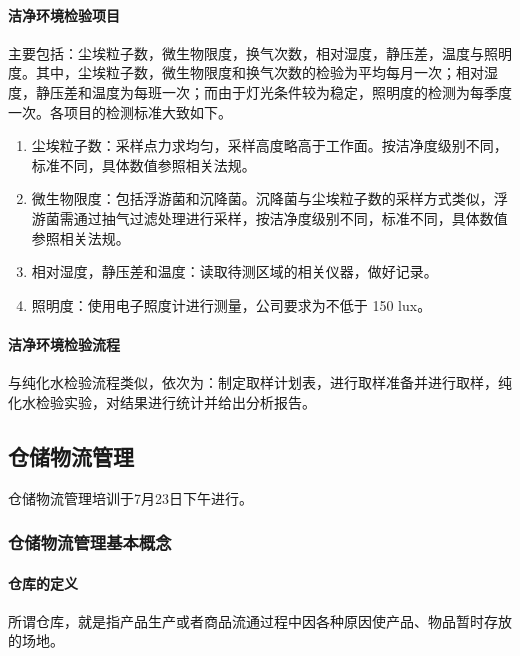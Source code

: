 \documentclass[cn,black,12pt,normal]{elegantnote}
\begin{document}
\paragraph{洁净环境检验项目} 主要包括：尘埃粒子数，微生物限度，换气次数，相对湿度，静压差，温度与照明度。其中，尘埃粒子数，微生物限度和换气次数的检验为平均每月一次；相对湿度，静压差和温度为每班一次；而由于灯光条件较为稳定，照明度的检测为每季度一次。各项目的检测标准大致如下。

\begin{enumerate}
    \item 尘埃粒子数：采样点力求均匀，采样高度略高于工作面。按洁净度级别不同，标准不同，具体数值参照相关法规。
    \item 微生物限度：包括浮游菌和沉降菌。沉降菌与尘埃粒子数的采样方式类似，浮游菌需通过抽气过滤处理进行采样，按洁净度级别不同，标准不同，具体数值参照相关法规。
    \item 相对湿度，静压差和温度：读取待测区域的相关仪器，做好记录。
    \item 照明度：使用电子照度计进行测量，公司要求为不低于 150 lux。
\end{enumerate}

\paragraph{洁净环境检验流程} 与纯化水检验流程类似，依次为：制定取样计划表，进行取样准备并进行取样，纯化水检验实验，对结果进行统计并给出分析报告。

\subsection{仓储物流管理}
仓储物流管理培训于7月23日下午进行。

\subsubsection{仓储物流管理基本概念}

\paragraph{仓库的定义} 所谓仓库，就是指产品生产或者商品流通过程中因各种原因使产品、物品暂时存放的场地。
\end{document}
